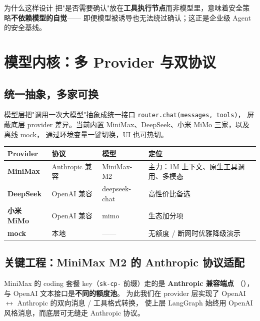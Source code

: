 \begin{keybox}{为什么这样设计}
把"是否需要确认"放在\textbf{工具执行节点}而非模型里，意味着安全策略\textbf{不依赖模型的自觉}——
即便模型被诱导也无法绕过确认；这正是企业级 Agent 的安全基线。
\end{keybox}


\chapter{模型内核：多 Provider 与双协议}

\section{统一抽象，多家可换}
模型层把"调用一次大模型"抽象成统一接口 \texttt{router.chat(messages, tools)}，
屏蔽底层 provider 差异。当前内置 MiniMax、DeepSeek、小米 MiMo 三家，以及离线 mock，
通过环境变量一键切换，UI 也可热切。

\begin{center}
\footnotesize
\begin{tabularx}{\linewidth}{>{\bfseries}p{2.2cm} p{2.2cm} p{3.0cm} X}
\toprule
Provider & 协议 & 模型 & 定位 \\
\midrule
MiniMax & Anthropic 兼容 & MiniMax-M2 & 主力：1M 上下文、原生工具调用、多模态 \\
DeepSeek & OpenAI 兼容 & deepseek-chat & 高性价比备选 \\
小米 MiMo & OpenAI 兼容 & mimo & 生态加分项 \\
mock & 本地 & —— & 无额度 / 断网时优雅降级演示 \\
\bottomrule
\end{tabularx}
\end{center}

\section{关键工程：MiniMax M2 的 Anthropic 协议适配}
MiniMax 的 coding 套餐 key（\texttt{sk-cp-} 前缀）走的是 \textbf{Anthropic 兼容端点}
（），与 OpenAI 文本接口是\textbf{不同的额度池}。
为此我们在 provider 层实现了 OpenAI $\leftrightarrow$ Anthropic 的双向消息 / 工具格式转换，
使上层 LangGraph 始终用 OpenAI 风格消息，而底层可无缝走 Anthropic 协议。

\begin{center}
\end{center}

